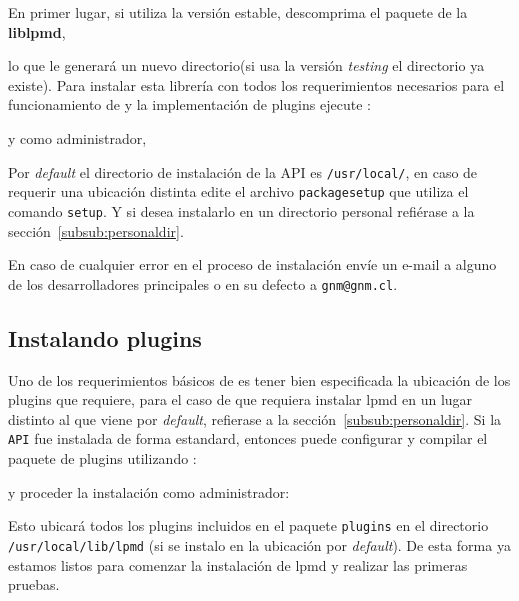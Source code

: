 En primer lugar, si utiliza la versi\'on estable, descomprima el paquete de la \textbf{liblpmd},


lo que le generar\'a un nuevo directorio(si usa la versi\'on \textit{testing} el directorio ya existe). Para instalar esta librer\'ia con todos los requerimientos necesarios para el funcionamiento de {\lpmd} y la implementaci\'on de plugins ejecute :


y como administrador,


Por \textit{default} el directorio de instalaci\'on de la API es \verb|/usr/local/|, en caso de requerir una ubicaci\'on distinta edite el archivo \verb|packagesetup| que utiliza el comando \verb|setup|. Y si desea instalarlo en un directorio personal refi\'erase a la secci\'on~\ref{subsub:personaldir}.

En caso de cualquier error en el proceso de instalaci\'on env\'ie un e-mail a alguno de los desarrolladores principales o en su defecto a \verb|gnm@gnm.cl|.

\subsection{Instalando plugins}

Uno de los requerimientos b\'asicos de {\lpmd} es tener bien especificada la ubicaci\'on de los plugins que {\lpmd} requiere, para el caso de que requiera instalar lpmd en un lugar distinto al que viene por \textit{default}, refierase a la secci\'on~\ref{subsub:personaldir}. Si la \verb|API| fue instalada de forma estandard, entonces puede configurar y compilar el paquete de plugins utilizando :


y proceder la instalaci\'on como administrador:


Esto ubicar\'a todos los plugins incluidos en el paquete \verb|plugins| en el directorio \verb|/usr/local/lib/lpmd| (si se instalo en la ubicaci\'on por \textit{default}). De esta forma ya estamos listos para comenzar la instalaci\'on de lpmd y realizar las primeras pruebas.

